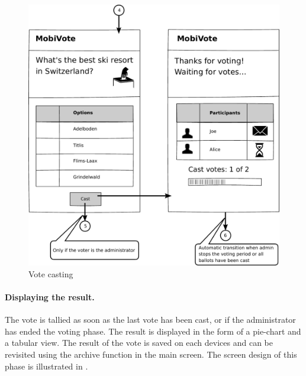 \documentclass[numbers=noenddot, abstract=on, a4paper, headsepline,
footsepline, oneside, draft=off]{scrreprt}
\begin{document}
\begin{figure}[htb]
	\centering
	\includegraphics[height=.3\textheight]{img/storyboard/vote}
	\caption{Vote casting}
	\label{fig:vote}
\end{figure}

\paragraph{Displaying the result.}
The vote is tallied as soon as the last vote has been cast, or if the
administrator has ended the voting phase. The result is displayed in the form of
a pie-chart and a tabular view. The result of the vote is saved on each devices
and can be revisited using the archive function in the main screen. The screen
design of this phase is illustrated in .
\end{document}
